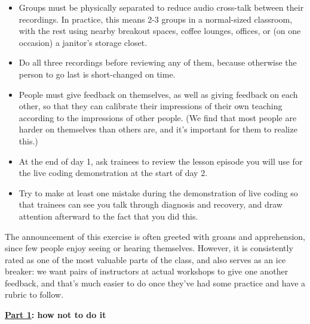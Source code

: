 \begin{itemize}

\item
  Groups must be physically separated to reduce audio cross-talk
  between their recordings. In practice, this means 2-3 groups in a
  normal-sized classroom, with the rest using nearby breakout spaces,
  coffee lounges, offices, or (on one occasion) a janitor's storage
  closet.

\item
  Do all three recordings before reviewing any of them, because
  otherwise the person to go last is short-changed on time.

\item
  People must give feedback on themselves, as well as giving feedback
  on each other, so that they can calibrate their impressions of their
  own teaching according to the impressions of other people. (We find
  that most people are harder on themselves than others are, and it's
  important for them to realize this.)

\item
  At the end of day 1, ask trainees to review the lesson episode you
  will use for the live coding demonstration at the start of day 2.

\item
  Try to make at least one mistake during the demonstration of live
  coding so that trainees can see you talk through diagnosis and
  recovery, and draw attention afterward to the fact that you did
  this.

\end{itemize}

The announcement of this exercise is often greeted with groans and
apprehension, since few people enjoy seeing or hearing themselves.
However, it is consistently rated as one of the most valuable parts of
the class, and also serves as an ice breaker: we want pairs of
instructors at actual workshops to give one another feedback, and
that's much easier to do once they've had some practice and have a
rubric to follow.


\noindent
\textbf{\href{https://youtu.be/bXxBeNkKmJE}{Part 1}: how not to do it}

